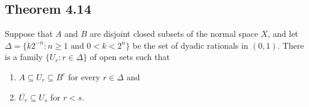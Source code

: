 \documentclass[../../main.tex]{subfiles}
\begin{document}
\subsection{Theorem 4.14}
\begin{wts}
    Suppose that $A$ and $B$ are disjoint closed subsets of the normal space $X$, and let $\Delta = \{k2^{-n}: n\geq 1 \text{ and } 0<k<2^n\}$ be the set of dyadic rationals in $(0,1)$. There is a family $\{U_r:r\in\Delta\}$ of open sets such that
    \begin{enumerate}
        \item $A\subseteq U_r\subseteq B^c$ for every $r\in \Delta$ and 
        \item $\overline{U_r}\subseteq U_s$ for $r<s$.
    \end{enumerate}
\end{wts}
\end{document}
